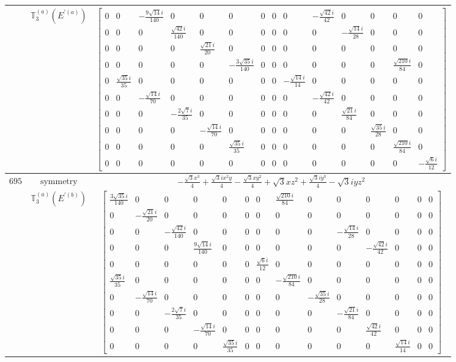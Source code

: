 \documentclass[fleqn,8pt,landscape]{jsarticle}
\begin{document}
\begin{longtable}{ccc}
$  $ & $ \mathbb{T}_{3}^{(a)}(E^{\prime(a)}) $ & $ \begin{bmatrix} 0 & 0 & - \frac{9 \sqrt{14} i}{140} & 0 & 0 & 0 & 0 & 0 & 0 & - \frac{\sqrt{42} i}{42} & 0 & 0 & 0 & 0 \\ 0 & 0 & 0 & \frac{\sqrt{42} i}{140} & 0 & 0 & 0 & 0 & 0 & 0 & - \frac{\sqrt{14} i}{28} & 0 & 0 & 0 \\ 0 & 0 & 0 & 0 & \frac{\sqrt{21} i}{20} & 0 & 0 & 0 & 0 & 0 & 0 & 0 & 0 & 0 \\ 0 & 0 & 0 & 0 & 0 & - \frac{3 \sqrt{35} i}{140} & 0 & 0 & 0 & 0 & 0 & 0 & \frac{\sqrt{210} i}{84} & 0 \\ 0 & \frac{\sqrt{35} i}{35} & 0 & 0 & 0 & 0 & 0 & 0 & - \frac{\sqrt{14} i}{14} & 0 & 0 & 0 & 0 & 0 \\ 0 & 0 & - \frac{\sqrt{14} i}{70} & 0 & 0 & 0 & 0 & 0 & 0 & - \frac{\sqrt{42} i}{42} & 0 & 0 & 0 & 0 \\ 0 & 0 & 0 & - \frac{2 \sqrt{7} i}{35} & 0 & 0 & 0 & 0 & 0 & 0 & \frac{\sqrt{21} i}{84} & 0 & 0 & 0 \\ 0 & 0 & 0 & 0 & - \frac{\sqrt{14} i}{70} & 0 & 0 & 0 & 0 & 0 & 0 & \frac{\sqrt{35} i}{28} & 0 & 0 \\ 0 & 0 & 0 & 0 & 0 & \frac{\sqrt{35} i}{35} & 0 & 0 & 0 & 0 & 0 & 0 & \frac{\sqrt{210} i}{84} & 0 \\ 0 & 0 & 0 & 0 & 0 & 0 & 0 & 0 & 0 & 0 & 0 & 0 & 0 & - \frac{\sqrt{6} i}{12} \end{bmatrix} $ \\ \hline
$ 695 $ & $ \text{symmetry} $ & $ - \frac{\sqrt{3} x^{3}}{4} + \frac{\sqrt{3} i x^{2} y}{4} - \frac{\sqrt{3} x y^{2}}{4} + \sqrt{3} x z^{2} + \frac{\sqrt{3} i y^{3}}{4} - \sqrt{3} i y z^{2} $ \\
$  $ & $ \mathbb{T}_{3}^{(a)}(E^{\prime(b)}) $ & $ \begin{bmatrix} \frac{3 \sqrt{35} i}{140} & 0 & 0 & 0 & 0 & 0 & 0 & \frac{\sqrt{210} i}{84} & 0 & 0 & 0 & 0 & 0 & 0 \\ 0 & - \frac{\sqrt{21} i}{20} & 0 & 0 & 0 & 0 & 0 & 0 & 0 & 0 & 0 & 0 & 0 & 0 \\ 0 & 0 & - \frac{\sqrt{42} i}{140} & 0 & 0 & 0 & 0 & 0 & 0 & - \frac{\sqrt{14} i}{28} & 0 & 0 & 0 & 0 \\ 0 & 0 & 0 & \frac{9 \sqrt{14} i}{140} & 0 & 0 & 0 & 0 & 0 & 0 & - \frac{\sqrt{42} i}{42} & 0 & 0 & 0 \\ 0 & 0 & 0 & 0 & 0 & 0 & \frac{\sqrt{6} i}{12} & 0 & 0 & 0 & 0 & 0 & 0 & 0 \\ \frac{\sqrt{35} i}{35} & 0 & 0 & 0 & 0 & 0 & 0 & - \frac{\sqrt{210} i}{84} & 0 & 0 & 0 & 0 & 0 & 0 \\ 0 & - \frac{\sqrt{14} i}{70} & 0 & 0 & 0 & 0 & 0 & 0 & - \frac{\sqrt{35} i}{28} & 0 & 0 & 0 & 0 & 0 \\ 0 & 0 & - \frac{2 \sqrt{7} i}{35} & 0 & 0 & 0 & 0 & 0 & 0 & - \frac{\sqrt{21} i}{84} & 0 & 0 & 0 & 0 \\ 0 & 0 & 0 & - \frac{\sqrt{14} i}{70} & 0 & 0 & 0 & 0 & 0 & 0 & \frac{\sqrt{42} i}{42} & 0 & 0 & 0 \\ 0 & 0 & 0 & 0 & \frac{\sqrt{35} i}{35} & 0 & 0 & 0 & 0 & 0 & 0 & \frac{\sqrt{14} i}{14} & 0 & 0 \end{bmatrix} $ \\ \hline

\end{longtable}
\end{document}
